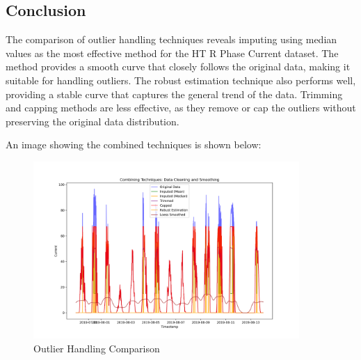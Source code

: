 \subsection{Conclusion}

The comparison of outlier handling techniques reveals imputing using median values as the most effective method for the HT R Phase Current dataset. The method provides a smooth curve that closely follows the original data, making it suitable for handling outliers. The robust estimation technique also performs well, providing a stable curve that captures the general trend of the data. Trimming and capping methods are less effective, as they remove or cap the outliers without preserving the original data distribution. 

An image showing the combined techniques is shown below:

\begin{figure}[H]
	\centering
	\includegraphics[width=0.9\textwidth]{./Images/combined_techniques.png}
	\caption{Outlier Handling Comparison}
\end{figure}

\clearpage